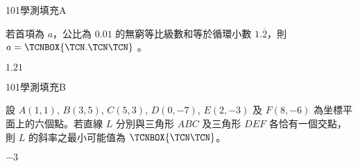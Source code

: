 \begin{QUESTIONS}
    \begin{QUESTION}
        \begin{ExamInfo}{101}{學測}{填充}{A}
        \end{ExamInfo}
        \begin{ExamAnsRateInfo}{44}{86}{39}{7}
        \end{ExamAnsRateInfo}
        \begin{QBODY}
            若首項為 $a$，公比為 $0.01$ 的無窮等比級數和等於循環小數 $1.\overline{2}$，則 $a=\TCNBOX{\TCN.\TCN\TCN}$ 。
        \end{QBODY}
        \begin{QFROMS}
        \end{QFROMS}
        \begin{QTAGS}\end{QTAGS}
        \begin{QANS}
            $1.21$
        \end{QANS}
        \begin{QSOLLIST}
        \end{QSOLLIST}
        \begin{QEMPTYSPACE}
        \end{QEMPTYSPACE}
    \end{QUESTION}
    \begin{QUESTION}
        \begin{ExamInfo}{101}{學測}{填充}{B}
        \end{ExamInfo}
        \begin{ExamAnsRateInfo}{39}{71}{39}{7}
        \end{ExamAnsRateInfo}
        \begin{QBODY}
            設 $A(1,1)$, $B(3,5)$, $C(5,3)$, $D(0,-7)$, $E(2,-3)$ 及 $F(8,-6)$ 為坐標平面上的六個點。若直線 $L$ 分別與三角形 $ABC$ 及三角形 $DEF$ 各恰有一個交點，則 $L$ 的斜率之最小可能值為 $\TCNBOX{\TCN\TCN}$。
        \end{QBODY}
        \begin{QFROMS}
        \end{QFROMS}
        \begin{QTAGS}\end{QTAGS}
        \begin{QANS}
            $-3$
        \end{QANS}
        \begin{QSOLLIST}
        \end{QSOLLIST}

\end{QUESTION}
\end{QUESTIONS}

